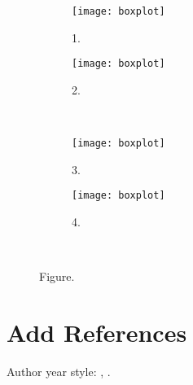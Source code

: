 \begin{figure}[htb]
    \centering
    \begin{subfigure}{0.49\textwidth}
      \texttt{[image: boxplot]}
      \caption{1.}
    \end{subfigure}
    \begin{subfigure}{0.49\textwidth}
      \texttt{[image: boxplot]}
      \caption{2.}
    \end{subfigure}\\[1mm]
    \begin{subfigure}{0.49\textwidth}
      \texttt{[image: boxplot]}
      \caption{3.}
    \end{subfigure}
    \begin{subfigure}{0.49\textwidth}
      \texttt{[image: boxplot]}
      \caption{4.}
    \end{subfigure}\\[1mm]
    \caption{Figure.}
    \label{figure: 3}
\end{figure}

\section{Add References}
Author year style: \cite{xue2020online}, \citep{xue2020online}.
